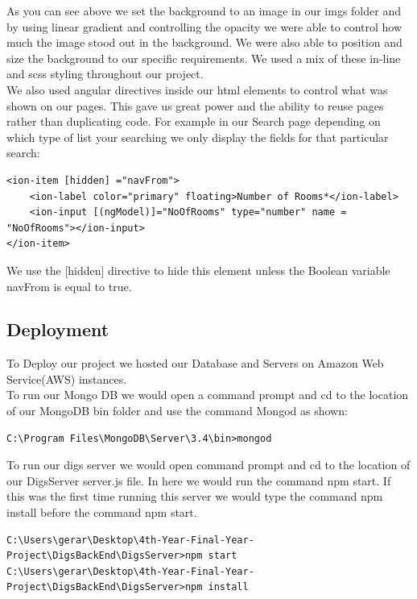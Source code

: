 As you can see above we set the background to an image in our imgs folder and by using linear gradient and controlling the opacity we were able to control how much the image stood out in the background. We were also able to position and size the background to our specific requirements. We used a mix of these in-line and scss styling throughout our project.\\

\noindent We also used angular directives inside our html elements to control what was shown on our pages. This gave us great power and the ability to reuse pages rather than duplicating code. For example in our Search page depending on which type of list your searching we only display the fields for that particular search:

\begin{verbatim}
<ion-item [hidden] ="navFrom">
    <ion-label color="primary" floating>Number of Rooms*</ion-label>
    <ion-input [(ngModel)]="NoOfRooms" type="number" name = "NoOfRooms"></ion-input>
</ion-item>
\end{verbatim}

We use the [hidden] directive to hide this element unless the Boolean variable navFrom is equal to true.

\subsection{Deployment}

To Deploy our project we hosted our Database and Servers on Amazon Web Service(AWS) instances.\\

\noindent To run our Mongo DB we would open a command prompt and cd to the location of our MongoDB bin folder and use the command Mongod as shown:

\begin{verbatim}
C:\Program Files\MongoDB\Server\3.4\bin>mongod
\end{verbatim}

\noindent To run our digs server we would open command prompt and cd to the location of our DigsServer server.js file. In here we would run the command npm start. If this was the first time running this server we would type the command npm install  before the command npm start.

\begin{verbatim}
C:\Users\gerar\Desktop\4th-Year-Final-Year-Project\DigsBackEnd\DigsServer>npm start
C:\Users\gerar\Desktop\4th-Year-Final-Year-Project\DigsBackEnd\DigsServer>npm install
\end{verbatim}

